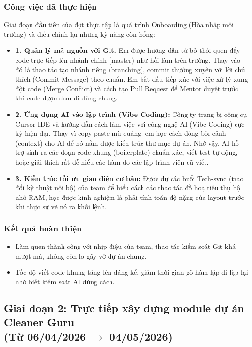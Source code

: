 \documentclass[12pt, a4paper]{article}
\begin{document}
\subsubsection{Công việc đã thực hiện}
Giai đoạn đầu tiên của đợt thực tập là quá trình Onboarding (Hòa nhập môi trường) và điều chỉnh lại những kỹ năng còn hổng:
\begin{itemize}
    \item \textbf{1. Quản lý mã nguồn với Git:} 
    Em được hướng dẫn từ bỏ thói quen đẩy code trực tiếp lên nhánh chính (master) như hồi làm trên trường. Thay vào đó là thao tác tạo nhánh riêng (branching), commit thường xuyên với lời chú thích (Commit Message) theo chuẩn. Em bắt đầu tiếp xúc với việc xử lý xung đột code (Merge Conflict) và cách tạo Pull Request để Mentor duyệt trước khi code được đem đi dùng chung.
    
    \item \textbf{2. Ứng dụng AI vào lập trình (Vibe Coding):} 
    Công ty trang bị công cụ Cursor IDE và hướng dẫn cách làm việc với công nghệ AI (Vibe Coding) cực kỳ hiện đại. Thay vì copy-paste mù quáng, em học cách dóng bối cảnh (context) cho AI để nó nắm được kiến trúc thư mục dự án. Nhờ vậy, AI hỗ trợ sinh ra các đoạn code khung (boilerplate) chuẩn xác, viết test tự động, hoặc giải thích rất dễ hiểu các hàm do các lập trình viên cũ viết.
    
    \item \textbf{3. Kiến trúc tối ưu giao diện cơ bản:}
    Được dự các buổi Tech-sync (trao đổi kỹ thuật nội bộ) của team để hiểu cách các thao tác đồ hoạ tiêu thụ bộ nhớ RAM, học được kinh nghiệm là phải tính toán độ nặng của layout trước khi thực sự vẽ nó ra khối lệnh.
\end{itemize}

\subsubsection{Kết quả hoàn thiện}
\begin{itemize}
    \item Làm quen thành công với nhịp điệu của team, thao tác kiểm soát Git khá mượt mà, không còn lo gây vỡ dự án chung.
    \item Tốc độ viết code khung tăng lên đáng kể, giảm thời gian gõ hàm lặp đi lặp lại nhờ biết kiểm soát AI đúng cách.
\end{itemize}

\subsection[Giai đoạn 2: Trực tiếp xây dựng module dự án Cleaner Guru (Từ 06/04/2026 đến 04/05/2026)]{Giai đoạn 2: Trực tiếp xây dựng module dự án Cleaner Guru \\(Từ 06/04/2026 $\rightarrow$ 04/05/2026)}
\end{document}
